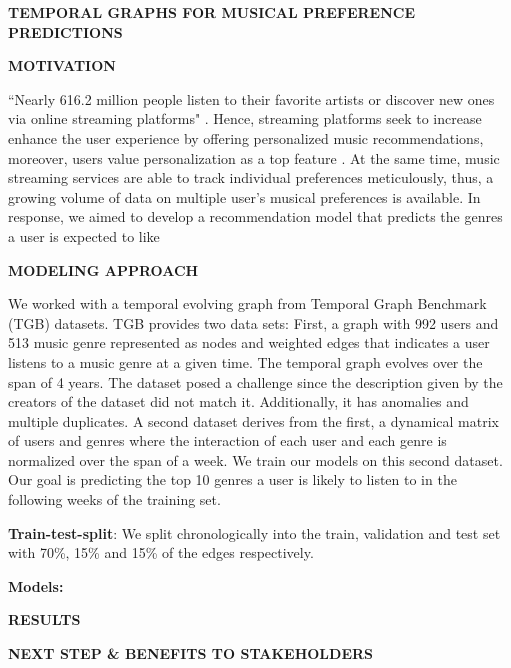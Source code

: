 \documentclass[10pt, letterpaper]{article}
\renewcommand{\title}[1]{%
	\begin{center}
		{\Large \bfseries \uppercase{#1}}
	\end{center}
}
\renewcommand{\section}[1]{%
	    \vspace{\parskip}
		{\large \bfseries\uppercase{#1}}
}
\begin{document}
	
\title{Temporal Graphs for Musical preference predictions}

\section{Motivation}

``Nearly 616.2 million people listen to their favorite artists or discover new ones via online streaming platforms" \cite{statista}. Hence, streaming platforms seek to increase enhance the user experience by offering personalized music recommendations, moreover, users value personalization as a top feature \cite{spotify}. At the same time, music streaming services are able to track individual preferences meticulously, thus, a growing volume of data on  multiple user's musical preferences is available.
In response, we aimed to develop a recommendation model that predicts the genres a user is expected to like

\section{Modeling approach}

We worked with a temporal evolving graph from Temporal Graph Benchmark (TGB) \cite{H:2023} datasets. TGB provides two data sets: First, a graph with 992 users and 513 music genre represented as nodes and weighted edges that indicates a user listens to a music genre at a given time. The temporal graph evolves over the span of 4 years.  The dataset posed a challenge since the description given by the creators of the dataset did not match it. Additionally, it has anomalies and multiple duplicates. A second dataset derives from the first, a dynamical matrix of users and genres where the interaction of each user and each genre is normalized over the span of a week. We train our models on this second dataset. Our goal is predicting the top 10 genres a user is likely to listen to in the following weeks of the training set.
 
\textbf{Train-test-split}: We split chronologically into the train, validation and test set with 70\%, 15\% and 15\% of the edges respectively. 

\textbf{Models:}

\section{Results}


\section{Next step \& benefits to stakeholders}
\end{document}
